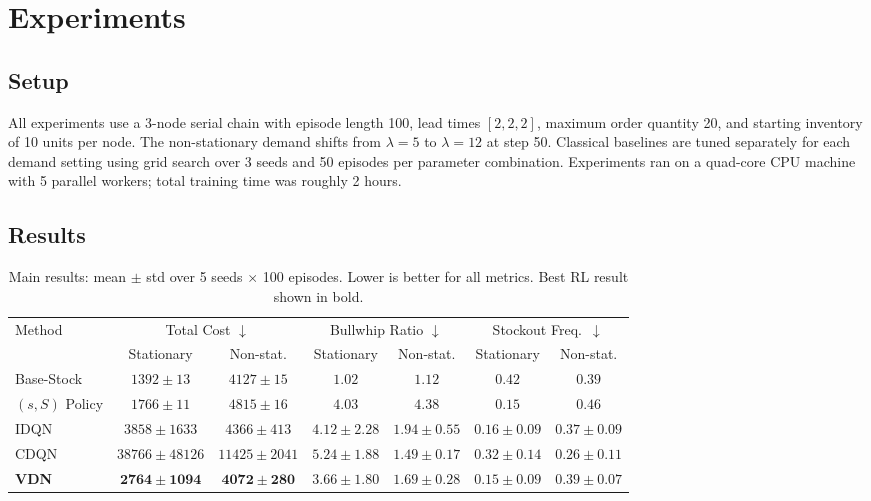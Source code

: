 \documentclass{article}
\begin{document}
\FloatBarrier
\section{Experiments}

\subsection{Setup}

All experiments use a 3-node serial chain with episode length 100,
lead times $[2,2,2]$, maximum order quantity 20, and starting
inventory of 10 units per node. The non-stationary demand shifts from
$\lambda = 5$ to $\lambda = 12$ at step 50. Classical baselines are
tuned separately for each demand setting using grid search over 3 seeds
and 50 episodes per parameter combination. Experiments ran on a
quad-core CPU machine with 5 parallel workers; total training time
was roughly 2 hours.

\subsection{Results}

\begin{table}[H]
\centering
\caption{Main results: mean $\pm$ std over 5 seeds $\times$ 100 episodes.
         Lower is better for all metrics. Best RL result shown in bold.}
\label{tab:main}
\footnotesize
\begin{tabular}{lcccccc}
\toprule
\multirow{2}{*}{Method}
  & \multicolumn{2}{c}{Total Cost $\downarrow$}
  & \multicolumn{2}{c}{Bullwhip Ratio $\downarrow$}
  & \multicolumn{2}{c}{Stockout Freq.\ $\downarrow$} \\
\cmidrule(lr){2-3}\cmidrule(lr){4-5}\cmidrule(lr){6-7}
  & Stationary & Non-stat. & Stationary & Non-stat. & Stationary & Non-stat. \\
\midrule
Base-Stock    & $1392 \pm 13$   & $4127 \pm 15$  & $1.02$ & $1.12$ & $0.42$ & $0.39$ \\
$(s,S)$ Policy & $1766 \pm 11$  & $4815 \pm 16$  & $4.03$ & $4.38$ & $0.15$ & $0.46$ \\
\midrule
IDQN          & $3858 \pm 1633$ & $4366 \pm 413$ & $4.12 \pm 2.28$ & $1.94 \pm 0.55$ & $0.16 \pm 0.09$ & $0.37 \pm 0.09$ \\
CDQN          & $38766 \pm 48126$ & $11425 \pm 2041$ & $5.24 \pm 1.88$ & $1.49 \pm 0.17$ & $0.32 \pm 0.14$ & $0.26 \pm 0.11$ \\
\textbf{VDN}  & $\mathbf{2764 \pm 1094}$ & $\mathbf{4072 \pm 280}$ & $3.66 \pm 1.80$ & $1.69 \pm 0.28$ & $0.15 \pm 0.09$ & $0.39 \pm 0.07$ \\
\bottomrule
\end{tabular}
\end{table}
\end{document}
